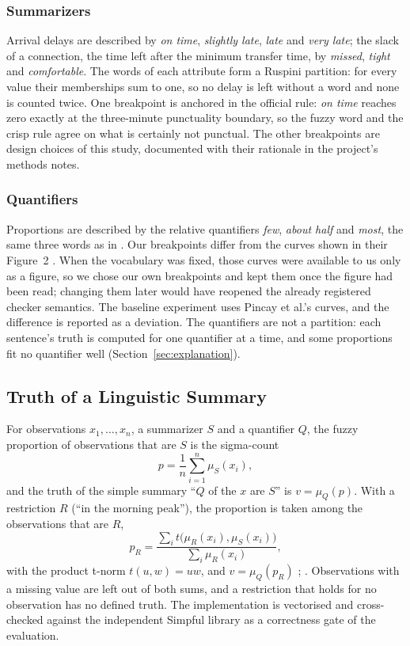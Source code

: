 \subsubsection*{Summarizers} Arrival delays are described by \emph{on time}, \emph{slightly
late}, \emph{late} and \emph{very late}; the slack of a connection, the time left after the
minimum transfer time, by \emph{missed}, \emph{tight} and \emph{comfortable}. The words of
each attribute form a Ruspini partition: for every value their memberships sum to one, so no
delay is left without a word and none is counted twice. One breakpoint is anchored in the
official rule: \emph{on time} reaches zero exactly at the three-minute punctuality boundary,
so the fuzzy word and the crisp rule agree on what is certainly not punctual. The other
breakpoints are design choices of this study, documented with their rationale in the
project's methods notes.

\subsubsection*{Quantifiers} Proportions are described by the relative quantifiers \emph{few},
\emph{about half} and \emph{most}, the same three words as in \citet{pincay2021}. Our
breakpoints differ from the curves shown in their Figure~2 \citep[p.~172]{pincay2021}. When
the vocabulary was fixed, those curves were available to us only as a figure, so we chose
our own breakpoints and kept them once the figure had been read; changing them later would
have reopened the already registered checker semantics. The baseline experiment uses
Pincay et al.'s curves, and the difference is reported as a deviation. The quantifiers are
not a partition: each sentence's truth is computed for one quantifier at a time, and some
proportions fit no quantifier well (Section~\ref{sec:explanation}).

\subsection{Truth of a Linguistic Summary}
\label{sec:truth}
For observations $x_1, \dots, x_n$, a summarizer $S$ and a quantifier $Q$, the fuzzy
proportion of observations that are $S$ is the sigma-count
\begin{equation}
  p = \frac{1}{n} \sum_{i=1}^{n} \mu_S(x_i),
\end{equation}
and the truth of the simple summary ``$Q$ of the $x$ are $S$'' is $v = \mu_Q(p)$. With a
restriction $R$ (``in the morning peak''), the proportion is taken among the observations
that are $R$,
\begin{equation}
  p_R = \frac{\sum_{i} t\big(\mu_R(x_i), \mu_S(x_i)\big)}{\sum_{i} \mu_R(x_i)},
\end{equation}
with the product t-norm $t(u, w) = uw$, and $v = \mu_Q(p_R)$
\citep[Eq.~(2)]{pincay2021}; \citep[Eqs.~(5)--(6)]{hudec2022}. Observations with a missing
value are left out of both sums, and a restriction that holds for no observation has no
defined truth. The implementation is vectorised and cross-checked against the independent
Simpful library \citep{spolaor2020} as a correctness gate of the evaluation.

